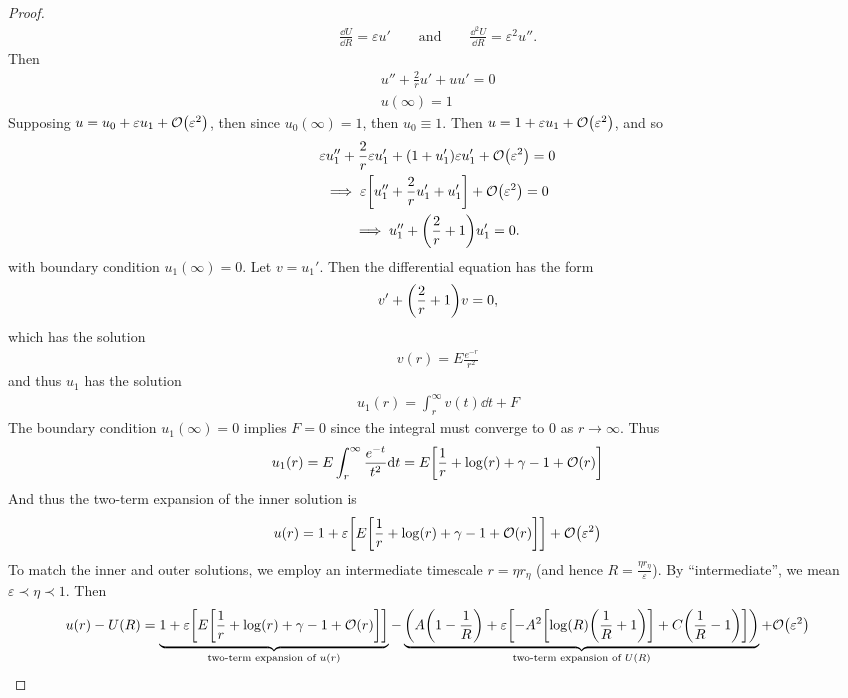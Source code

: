 \documentclass{article} %
\theoremstyle{plain}
\newcommand{\E}{\varepsilon}
\numberwithin{equation}{section} %
\numberwithin{figure}{section} %
\numberwithin{table}{section} %
\begin{document}
\begin{proof}
\begin{align*}
        \frac{\dd U}{\dd R} = \E u' \qquad \text{and} \qquad  \frac{\dd^2 U}{\dd R} = \E^2 u''.
    \end{align*}
    Then
    \begin{gather*}
        u'' + \frac{2}{r}u' + u u' = 0 \\
        u(\infty) = 1
    \end{gather*}
    Supposing $u = u_0 + \E u_1 + \order{\E^2}$, then since $u_0(\infty) = 1$, then $u_0 \equiv 1$.  Then $u = 1 + \E u_1 + \order{\E^2}$, and so
    \begin{gather*}
        \E u_1'' + \frac{2}{r}\E u_1' + \qty(1 + u_1')\E u_1' + \order{\E^2} = 0 \\
        \implies \E \qty[u_1'' + \frac{2}{r} u_1' + u_1'] + \order{\E^2} = 0 \\
        \implies u_1'' + \qty(\frac{2}{r} + 1)u_1' = 0.
    \end{gather*}
    with boundary condition $u_1(\infty) = 0$.  Let $v = u_1'$.  Then the differential equation has the form
    \begin{align*}
        v' + \qty(\frac{2}{r} + 1)v = 0,
    \end{align*}
    which has the solution
    \begin{align*}
        v(r) = E\frac{e^{-r}}{r^2}
    \end{align*}
    and thus $u_1$ has the solution
    \begin{align*}
        u_1(r) = \int_r^\infty v(t) \dd t + F
    \end{align*}
    The boundary condition $u_1(\infty) = 0$ implies $F = 0$ since the integral must converge to $0$ as $r \rightarrow \infty$.  Thus
    \begin{align*}
        u_1(r) = E\int_r^\infty \frac{e^{-t}}{t^2}\dd t = E\qty[\frac{1}{r} + \log(r) + \gamma - 1 + \order{r}]
    \end{align*}
    And thus the two-term expansion of the inner solution is
    \begin{align*}
        u(r) = 1 + \E\qty[E\qty[\frac{1}{r} + \log(r) + \gamma- 1 + \order{r}]] + \order{\E^2}
    \end{align*}
    To match the inner and outer solutions, we employ an intermediate timescale $r = \eta r_\eta$ (and hence $R = \frac{\eta r_\eta}{\E}$).  By ``intermediate'', we mean $\E \prec \eta \prec 1$.  Then
    \begin{align*}
        u(r) - U(R) &= \underbrace{1 + \E\qty[E\qty[\frac{1}{r} + \log(r) + \gamma - 1 + \order{r}]]}_{\text{two-term expansion of } u(r)} - \underbrace{\qty(A\qty(1 - \frac{1}{R}) + \E\qty[-A^2\qty[\log(R)\qty(\dfrac{1}{R} + 1)] + C\qty(\dfrac{1}{R} - 1)])}_{\text{two-term expansion of } U(R)} + \order{\E^2} \\

\end{align*}
\end{proof}
\end{document}
